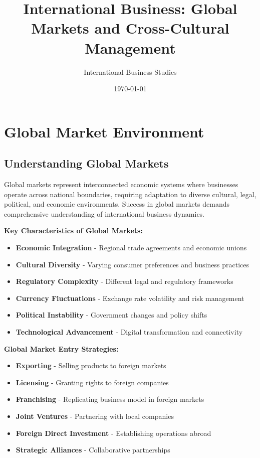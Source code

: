 \documentclass[12pt]{article}
\title{International Business: Global Markets and Cross-Cultural Management}
\author{International Business Studies}
\date{\today}
\begin{document}
\maketitle

\section{Global Market Environment}

\subsection{Understanding Global Markets}
Global markets represent interconnected economic systems where businesses operate across national boundaries, requiring adaptation to diverse cultural, legal, political, and economic environments. Success in global markets demands comprehensive understanding of international business dynamics.

\textbf{Key Characteristics of Global Markets:}
\begin{itemize}
    \item \textbf{Economic Integration} - Regional trade agreements and economic unions
    \item \textbf{Cultural Diversity} - Varying consumer preferences and business practices
    \item \textbf{Regulatory Complexity} - Different legal and regulatory frameworks
    \item \textbf{Currency Fluctuations} - Exchange rate volatility and risk management
    \item \textbf{Political Instability} - Government changes and policy shifts
    \item \textbf{Technological Advancement} - Digital transformation and connectivity
\end{itemize}

\textbf{Global Market Entry Strategies:}
\begin{itemize}
    \item \textbf{Exporting} - Selling products to foreign markets
    \item \textbf{Licensing} - Granting rights to foreign companies
    \item \textbf{Franchising} - Replicating business model in foreign markets
    \item \textbf{Joint Ventures} - Partnering with local companies
    \item \textbf{Foreign Direct Investment} - Establishing operations abroad
    \item \textbf{Strategic Alliances} - Collaborative partnerships
\end{itemize}
\end{document}
